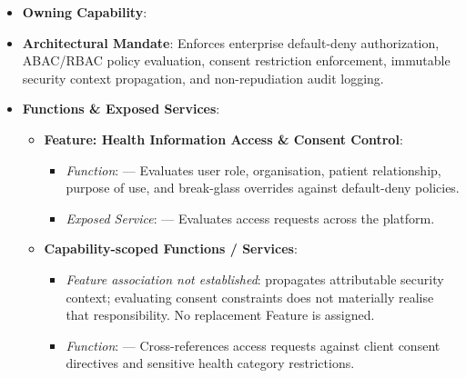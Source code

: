 \begin{itemize}

\item 
\textbf{Owning Capability}: \texttt{}



\item 
\textbf{Architectural Mandate}: Enforces enterprise default-deny authorization, ABAC/\allowbreak{}RBAC policy evaluation, consent restriction enforcement, immutable security context propagation, and non-repudiation audit logging.



\item 
\textbf{Functions \& Exposed Services}:


\begin{itemize}

\item 
\textbf{Feature: Health Information Access \& Consent Control}:


\begin{itemize}

\item 
\emph{Function}: \texttt{} — Evaluates user role, organisation, patient relationship, purpose of use, and break-glass overrides against default-deny policies.



\item 
\emph{Exposed Service}: \texttt{} — Evaluates access requests across the platform.



\end{itemize}


\item 
\textbf{Capability-scoped Functions /\allowbreak{} Services}:


\begin{itemize}

\item 
\emph{Feature association not established}: \texttt{} propagates attributable security context; evaluating consent constraints does not materially realise that responsibility. No replacement Feature is assigned.



\item 
\emph{Function}: \texttt{} — Cross-references access requests against client consent directives and sensitive health category restrictions.




\end{itemize}
\end{itemize}
\end{itemize}
